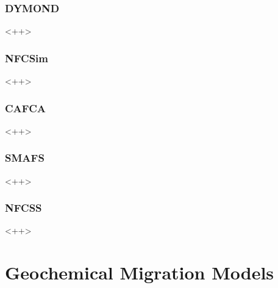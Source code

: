 \subsubsection{DYMOND}<++>
\subsubsection{NFCSim}<++>
\subsubsection{CAFCA}<++>
\subsubsection{SMAFS}<++>
\subsubsection{NFCSS}<++>
\section{Geochemical Migration Models}
